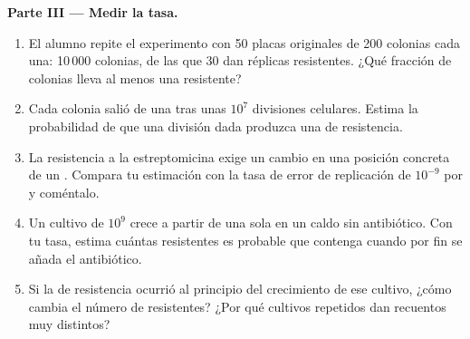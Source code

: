 \begin{problem}
\medskip
\noindent\textbf{Parte III --- Medir la tasa.}
\begin{enumerate}[resume]
  \item El alumno repite el experimento con 50 placas originales de 200
        colonias cada una: 10\,000 colonias, de las que 30 dan réplicas
        resistentes. ¿Qué fracción de colonias lleva al menos una
         resistente?
  \item Cada colonia salió de una  tras unas $10^7$ divisiones
        celulares. Estima la probabilidad de que una división dada
        produzca una  de resistencia.
  \item La resistencia a la estreptomicina exige un cambio en una
        posición concreta de un . Compara tu estimación con la tasa
        de error de replicación de $10^{-9}$ por  y
        coméntalo.
  \item Un cultivo de $10^9$  crece a partir de una sola en un
        caldo sin antibiótico. Con tu tasa, estima cuántas 
        resistentes es probable que contenga cuando por fin se añada el
        antibiótico.
  \item Si la  de resistencia ocurrió al principio del
        crecimiento de ese cultivo, ¿cómo cambia el número de 
        resistentes? ¿Por qué cultivos repetidos dan recuentos muy
        distintos?
\end{enumerate}


\end{problem}
